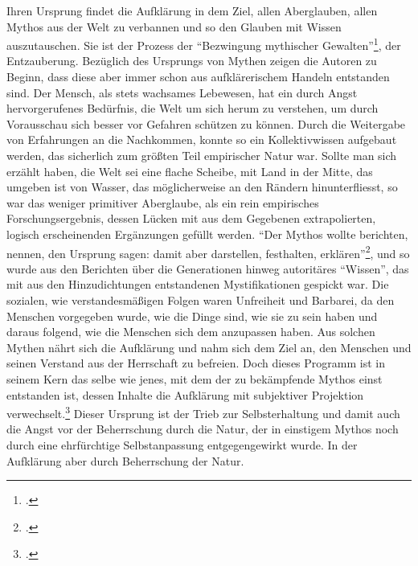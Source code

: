 \documentclass[a4paper, 12pt]{article}
\begin{document}
\begin{onehalfspace}
Ihren Ursprung findet die Aufklärung in dem Ziel, allen Aberglauben, allen Mythos aus der Welt zu verbannen und so den Glauben mit Wissen auszutauschen. Sie ist der Prozess der "`Bezwingung mythischer Gewalten"'\footnote{\Cite[Siehe][S. 408]{habermas}.}, der Entzauberung. Bezüglich des Ursprungs von Mythen zeigen die Autoren zu Beginn, dass diese aber immer schon aus aufklärerischem Handeln entstanden sind. Der Mensch, als stets wachsames Lebewesen, hat ein durch Angst hervorgerufenes Bedürfnis, die Welt um sich herum zu verstehen, um durch Vorausschau sich besser vor Gefahren schützen zu können. Durch die Weitergabe von Erfahrungen an die Nachkommen, konnte so ein Kollektivwissen aufgebaut werden, das sicherlich zum größten Teil empirischer Natur war. Sollte man sich erzählt haben, die Welt sei eine flache Scheibe, mit Land in der Mitte, das umgeben ist von Wasser, das möglicherweise an den Rändern hinunterfliesst, so war das weniger primitiver Aberglaube, als ein rein empirisches Forschungsergebnis, dessen Lücken mit aus dem Gegebenen extrapolierten, logisch erscheinenden Ergänzungen gefüllt werden. "`Der Mythos wollte berichten, nennen, den Ursprung sagen: damit aber darstellen, festhalten, erklären"'\footnote{\Cite[Siehe][S. 14]{dialektik-der-aufklaerung}.}, und so wurde aus den Berichten über die Generationen hinweg autoritäres "`Wissen"', das mit aus den Hinzudichtungen entstandenen Mystifikationen gespickt war. Die sozialen, wie verstandesmäßigen Folgen waren Unfreiheit und Barbarei, da den Menschen vorgegeben wurde, wie die Dinge sind, wie sie zu sein haben und daraus folgend, wie die Menschen sich dem anzupassen haben. Aus solchen Mythen nährt sich die Aufklärung und nahm sich dem Ziel an, den Menschen und seinen Verstand aus der Herrschaft zu befreien. Doch dieses Programm ist in seinem Kern das selbe wie jenes, mit dem der zu bekämpfende Mythos einst entstanden ist, dessen Inhalte die Aufklärung mit subjektiver Projektion verwechselt.\footnote{\Cite[Vgl.][S. 12]{dialektik-der-aufklaerung}.} Dieser Ursprung ist der Trieb zur Selbsterhaltung und damit auch die Angst vor der Beherrschung durch die Natur, der in einstigem Mythos noch durch eine ehrfürchtige Selbstanpassung entgegengewirkt wurde. In der Aufklärung aber durch Beherrschung der Natur. 


\end{onehalfspace}
\end{document}
